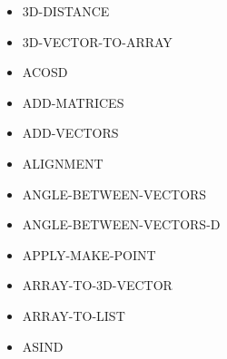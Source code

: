 \documentclass [11pt]{book}
\begin{document}
\label{subsec:functionandmacrodefinitions}



\begin{itemize}

\item {}3D-DISTANCE





\item {}3D-VECTOR-TO-ARRAY





\item {}ACOSD





\item {}ADD-MATRICES





\item {}ADD-VECTORS





\item {}ALIGNMENT





\item {}ANGLE-BETWEEN-VECTORS





\item {}ANGLE-BETWEEN-VECTORS-D





\item {}APPLY-MAKE-POINT





\item {}ARRAY-TO-3D-VECTOR





\item {}ARRAY-TO-LIST





\item {}ASIND






\end{itemize}
\end{document}

